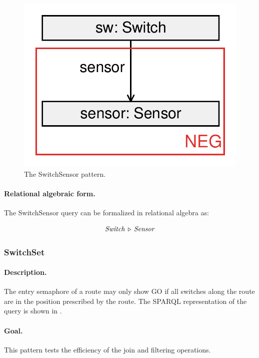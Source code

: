 \begin{figure}[htb]
	\centering
	\includegraphics[scale=0.4]{figures/pattern-switchsensor}
	\caption{The \textsf{SwitchSensor} pattern.}
	\label{fig:pattern-switchsensor}
\end{figure}

\paragraph{Relational algebraic form.} The \textsf{SwitchSensor} query can be formalized in relational algebra as:

$$ \mathit{Switch} \, \triangleright \, \mathit{Sensor} $$

\subsubsection{SwitchSet}

\paragraph{Description.}The entry semaphore of a route may only show GO if all switches along the route are in the position prescribed by the route. The SPARQL representation of the query is shown in .

\paragraph{Goal.} This pattern tests the efficiency of the join and filtering operations.


